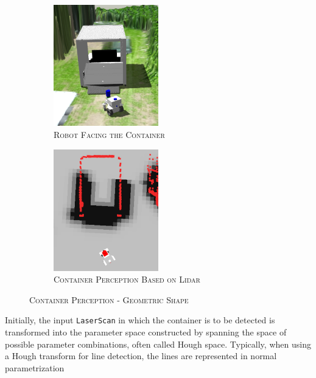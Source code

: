\documentclass[english, master, utf8]{base/thesis_KBS}
\newcommand{\code}[1]{\colorbox{light-gray}{\texttt{#1}}}
\begin{document}
\begin{figure}[H]
    \centering
    \begin{subfigure}[b]{0.49\textwidth}
        \centering
        \includegraphics[width=0.5\textwidth]{pics/container_view.png}
        \caption{\textsc{Robot Facing the Container}}
        \label{fig:container_view}
    \end{subfigure}
    \hfill
    \begin{subfigure}[b]{0.49\textwidth}
        \centering
        \includegraphics[width=0.5\textwidth]{pics/rviz_view.png}
        \caption{\textsc{Container Perception Based on Lidar}}
        \label{fig:rviz_view}
    \end{subfigure}
\caption{\textsc{Container Perception - Geometric Shape}}
\label{fig:container_geometric_shape}
\end{figure}
Initially, the input \code{LaserScan} in which the container is to be detected is transformed into the parameter space constructed by spanning the space of possible parameter
combinations, often called Hough space. Typically, when using a Hough transform for line detection, the lines are represented in normal parametrization
\end{document}
